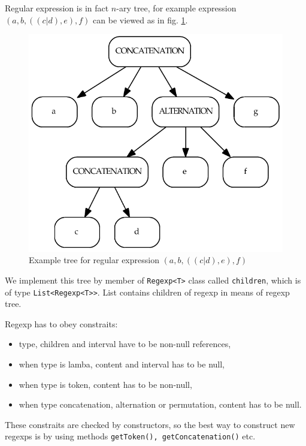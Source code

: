 \documentclass[a4paper,10pt,oneside]{article}
\newcommand{\myscale}{0.74}
\newcommand{\code}[1]{\texttt{#1}}
\begin{document}
Regular expression is in fact $n$-ary tree, for example expression $(a, b, ((c | d), e), f)$ can be viewed as in fig. \ref{reg_tree}.
\begin{figure}
\centering\includegraphics[scale=\myscale]{reg_tree}
\caption{Example tree for regular expression $(a, b, ((c | d), e), f)$} \label{reg_tree}
\end{figure}
We implement this tree by member of \code{Regexp<T>} class called \code{children}, which is of type \code{List<Regexp<T>{}>}.
List contains children of regexp in means of regexp tree.

Regexp has to obey constraits:
\begin{itemize}
	\item type, children and interval have to be non-null references,
	\item when type is lamba, content and interval has to be null,
	\item when type is token, content has to be non-null,
	\item when type concatenation, alternation or permutation, content has to be null.
\end{itemize}
These constraits are checked by constructors, so the best way to construct new regexps is by using 
methods \code{getToken(), getConcatenation()} etc.
\end{document}
